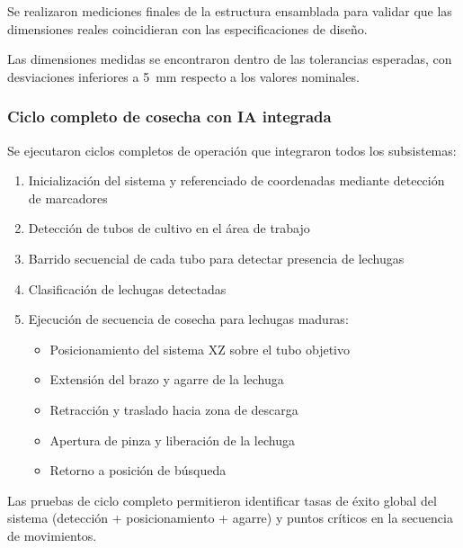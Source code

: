 Se realizaron mediciones finales de la estructura ensamblada para validar que las dimensiones reales coincidieran con las especificaciones de diseño.

Las dimensiones medidas se encontraron dentro de las tolerancias esperadas, con desviaciones inferiores a 5~mm respecto a los valores nominales.

\subsubsection{Ciclo completo de cosecha con IA integrada}

Se ejecutaron ciclos completos de operación que integraron todos los subsistemas:

\begin{enumerate}
    \item Inicialización del sistema y referenciado de coordenadas mediante detección de marcadores
    \item Detección de tubos de cultivo en el área de trabajo
    \item Barrido secuencial de cada tubo para detectar presencia de lechugas
    \item Clasificación de lechugas detectadas
    \item Ejecución de secuencia de cosecha para lechugas maduras:
    \begin{itemize}[label=$\bullet$]
        \item Posicionamiento del sistema XZ sobre el tubo objetivo
        \item Extensión del brazo y agarre de la lechuga
        \item Retracción y traslado hacia zona de descarga
        \item Apertura de pinza y liberación de la lechuga
        \item Retorno a posición de búsqueda
    \end{itemize}
\end{enumerate}

Las pruebas de ciclo completo permitieron identificar tasas de éxito global del sistema (detección + posicionamiento + agarre) y puntos críticos en la secuencia de movimientos. 

